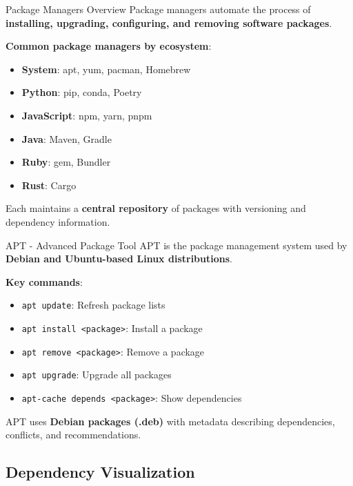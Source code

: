 \documentclass{beamer}
\begin{document}
\begin{frame}[t]{Package Managers Overview}
Package managers automate the process of \textbf{installing, upgrading, configuring, and removing software packages}.

\bigskip

\textbf{Common package managers by ecosystem}:
\begin{itemize}
\item \textbf{System}: apt, yum, pacman, Homebrew
\item \textbf{Python}: pip, conda, Poetry
\item \textbf{JavaScript}: npm, yarn, pnpm
\item \textbf{Java}: Maven, Gradle
\item \textbf{Ruby}: gem, Bundler
\item \textbf{Rust}: Cargo
\end{itemize}

\bigskip

Each maintains a \textbf{central repository} of packages with versioning and dependency information.
\end{frame}

\begin{frame}[t]{APT - Advanced Package Tool}
APT is the package management system used by \textbf{Debian and Ubuntu-based Linux distributions}.

\bigskip

\textbf{Key commands}:
\begin{itemize}
\item \texttt{apt update}: Refresh package lists
\item \texttt{apt install <package>}: Install a package
\item \texttt{apt remove <package>}: Remove a package
\item \texttt{apt upgrade}: Upgrade all packages
\item \texttt{apt-cache depends <package>}: Show dependencies
\end{itemize}

\bigskip

APT uses \textbf{Debian packages (.deb)} with metadata describing dependencies, conflicts, and recommendations.
\end{frame}

\subsection{Dependency Visualization}
\end{document}
